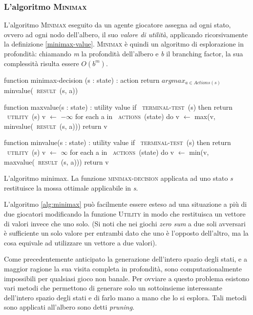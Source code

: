 \subsubsection*{L'algoritmo \textsc{Minimax}}

L'algoritmo \textsc{Minimax} eseguito da un agente giocatore assegna ad ogni stato, ovvero ad ogni nodo dell'albero, il suo \emph{valore di utilità}, applicando ricorsivamente la definizione \ref{minimax-value}.
\textsc{Minimax} è quindi un algoritmo di esplorazione in profondità: chiamando \emph{m} la profondità dell'albero e \emph{b} il branching factor, la sua complessità risulta essere $O(b^m)$.





\begin{algorithm}
\label{alg:minimax}
\begin{PseudoCode}[mathescape,escapechar=~]
function minimax-decision (s : state) : action
   return $argmax_{a \in Actions(s)}$ minvalue(~\textsc{result}~(s, a))

function maxvalue(s : state) : utility value
   if ~\textsc{terminal-test}~(s) then return ~\textsc{utility}~(s)
   v $ \leftarrow $ $ - \infty $
   for each a in ~\textsc{actions}~(state) do
      v $ \leftarrow $ max(v, minvalue(~\textsc{result}~(s, a)))
   return v
   
function minvalue(s : state) : utility value
   if ~\textsc{terminal-test}~(s) then return ~\textsc{utility}~(s)
   v $ \leftarrow $ $ \infty $
   for each a in ~\textsc{actions}~(state) do
      v $ \leftarrow $ min(v, maxvalue(~\textsc{result}~(s, a)))
   return v
\end{PseudoCode}
\caption{L'algoritmo minimax. La funzione \textsc{minimax-decision} applicata ad uno stato \emph{s} restituisce la mossa ottimale applicabile in \emph{s}. \cite{randw}}
\end{algorithm}

L'algoritmo \ref{alg:minimax} può facilmente essere esteso ad una situazione a più di due giocatori modificando la funzione \textsc{Utility} in modo che restituisca un vettore di valori invece che uno solo.
(Si noti che nei giochi \emph{zero sum} a due soli avversari è sufficiente un solo valore per entrambi dato che uno è l'opposto dell'altro, ma la cosa equivale ad utilizzare un vettore a due valori).

Come precedentemente anticipato la generazione dell'intero spazio degli stati, e a maggior ragione la sua visita completa in profondità, sono computazionalmente impossibili per qualsiasi gioco non banale.
Per ovviare a questo problema esistono vari metodi che permettono di generare solo un sottoinsieme interessante dell'intero spazio degli stati e di farlo mano a mano che lo si esplora. Tali metodi sono applicati all'albero sono detti \emph{pruning}.

